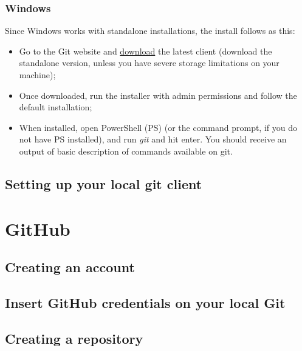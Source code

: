 \documentclass[
]{book}
\providecommand{\tightlist}{%
  \setlength{\itemsep}{0pt}\setlength{\parskip}{0pt}}
\begin{document}
\hypertarget{windows}{%
\subsubsection{Windows}\label{windows}}

Since Windows works with standalone installations, the install follows as this:

\begin{itemize}
\tightlist
\item
  Go to the Git website and \href{https://git-scm.com/download/win}{download} the
  latest client (download the standalone version, unless you have severe storage
  limitations on your machine);
\item
  Once downloaded, run the installer with admin permissions and follow the
  default installation;
\item
  When installed, open PowerShell (PS) (or the command prompt, if you do not
  have PS installed), and run \emph{git} and hit enter. You should receive an output of basic
  description of commands available on git.
\end{itemize}

\hypertarget{setting-up-your-local-git-client}{%
\subsection{Setting up your local git client}\label{setting-up-your-local-git-client}}

\hypertarget{github}{%
\section{GitHub}\label{github}}

\hypertarget{creating-an-account}{%
\subsection{Creating an account}\label{creating-an-account}}

\hypertarget{insert-github-credentials-on-your-local-git}{%
\subsection{Insert GitHub credentials on your local Git}\label{insert-github-credentials-on-your-local-git}}

\hypertarget{creating-a-repository}{%
\subsection{Creating a repository}\label{creating-a-repository}}
\end{document}
